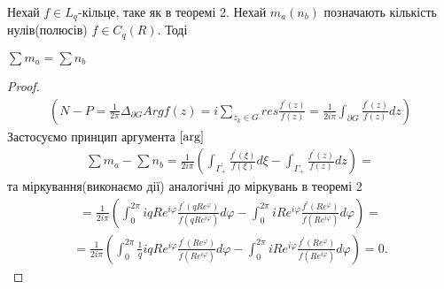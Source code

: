 \documentclass[12pt,a4paper]{article}
\begin{document}
\begin{thm}
Нехай $f\in L_{q}$-кільце, таке як в теоремі 2. Нехай $m_{a}(n_{b})$ позначають кількість нулів(полюсів) $f \in C_{q}(R)$. Тоді 
\begin{center}
$\sum m_{a}=\sum n_{b}$
\end{center}
\end{thm}
\begin{proof}

\begin{equation}\label{arg}
\begin{array}{l}                    
(N-P=\frac{1}{2\pi} \Delta_{\partial G} Arg f(z) =i\sum_{z_k\in G}^{ } res \frac{f^{'}(z)}{f(z)} = \frac{1}{2i\pi}\int_{\partial G}^{ }\frac{f^{'}(z)}{f(z)} dz) 
\end{array}
\end{equation}
Застосуємо принцип аргумента  $\eqref {arg} $
\[\begin{array}{l}
\sum m_{a}-\sum n_{b} = \frac{1}{2i\pi}(\int_{\Gamma^{'}_{+}}^{ } \frac{f^{'}(\xi )}{f(\xi) }d\xi-\int_{\Gamma_{+}}^{ } \frac{f^{'}(z)}{f(z)}dz)=
\end{array}\]
та міркування(виконаємо дії) аналогічні до міркувань в теоремі 2
\[\begin{array}{l}
= \frac{1}{2i\pi}(\int_{0}^{2\pi }iqRe^{i\varphi}\frac{f^{'}(qRe^{\varphi})}{f(qRe^{i\varphi })}d\varphi -
    \int_{0}^{2\pi }iRe^{i\varphi}\frac{f^{'}(Re^{\varphi})}{f(Re^{i\varphi })}d\varphi)=
\end{array}\]
\[\begin{array}{l}
= \frac{1}{2i\pi}(\int_{0}^{2\pi }\frac{1}{q}iqRe^{i\varphi}\frac{f^{'}(Re^{\varphi})}{f(Re^{i\varphi })}d\varphi -
    \int_{0}^{2\pi }iRe^{i\varphi}\frac{f^{'}(Re^{\varphi})}{f(Re^{i\varphi })}d\varphi)=0.
\end{array}\]
\end{proof}
\[\begin{array}{l}
\end{array} \]
\end{document}
